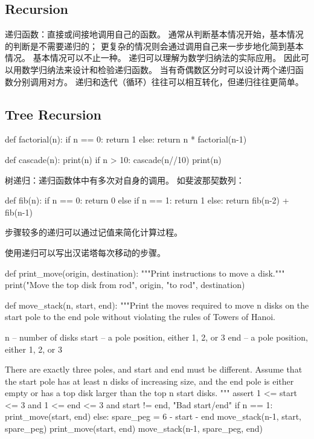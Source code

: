 \documentclass{ctexart}
\begin{document}
\subsection{Recursion}

递归函数：直接或间接地调用自己的函数。
通常从判断基本情况开始，基本情况的判断是不需要递归的；
更复杂的情况则会通过调用自己来一步步地化简到基本情况。
基本情况可以不止一种。
递归可以理解为数学归纳法的实际应用。
因此可以用数学归纳法来设计和检验递归函数。
当有奇偶数区分时可以设计两个递归函数分别调用对方。
递归和迭代（循环）往往可以相互转化，但递归往往更简单。

\subsection{Tree Recursion}

\begin{python}
    def factorial(n):
        if n == 0:
            return 1
        else:
            return n * factorial(n-1)
\end{python}

\begin{python}
    def cascade(n):
        print(n)
        if n > 10:
            cascade(n//10)
            print(n)
\end{python}

树递归：递归函数体中有多次对自身的调用。
如斐波那契数列：
\begin{python}
    def fib(n):
        if n == 0:
            return 0
        else if n == 1:
            return 1
        else:
            return fib(n-2) + fib(n-1)
\end{python}
步骤较多的递归可以通过记值来简化计算过程。

使用递归可以写出汉诺塔每次移动的步骤。
\begin{python}
    def print_move(origin, destination):
    """Print instructions to move a disk."""
    print("Move the top disk from rod", origin, "to rod", destination)

def move_stack(n, start, end):
    """Print the moves required to move n disks on the start pole to the end
    pole without violating the rules of Towers of Hanoi.

    n -- number of disks
    start -- a pole position, either 1, 2, or 3
    end -- a pole position, either 1, 2, or 3

    There are exactly three poles, and start and end must be different. Assume
    that the start pole has at least n disks of increasing size, and the end
    pole is either empty or has a top disk larger than the top n start disks.
    """
    assert 1 <= start <= 3 and 1 <= end <= 3 and start != end, "Bad start/end"
    if n == 1:
        print_move(start, end)
    else:
        spare_peg = 6 - start - end
        move_stack(n-1, start, spare_peg)
        print_move(start, end)
        move_stack(n-1, spare_peg, end)
\end{python}
\end{document}
